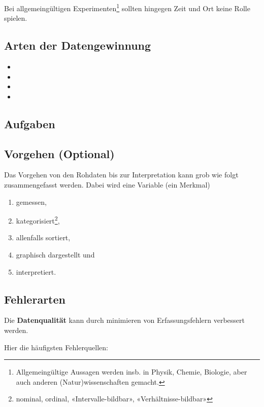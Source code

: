 Bei allgemeingültigen Experimenten\footnote{Allgemeingültige Aussagen
  werden insb. in Physik, Chemie, Biologie, aber auch anderen
  (Natur)wissenschaften gemacht.} sollten hingegen Zeit und Ort keine Rolle spielen.
\newpage

\subsection{Arten der Datengewinnung}
\begin{itemize}
 \item {}
 \item {}
 \item {}
 \item {}
\end{itemize}

\subsection*{Aufgaben}

\subsection{Vorgehen (Optional)}
Das Vorgehen von den Rohdaten bis zur Interpretation kann grob wie folgt zusammengefasst werden. Dabei wird eine Variable (ein Merkmal)
\begin{enumerate}
\item gemessen,
\item kategorisiert\footnote{nominal, ordinal, «Intervalle-bildbar»,
    «Verhältnisse-bildbar»},
\item allenfalls sortiert,
\item graphisch dargestellt und
\item interpretiert.
\end{enumerate}
\newpage


\subsection{Fehlerarten}


Die \textbf{Datenqualität} kann durch minimieren
von Erfassungsfehlern verbessert werden.

Hier die häufigsten Fehlerquellen:


